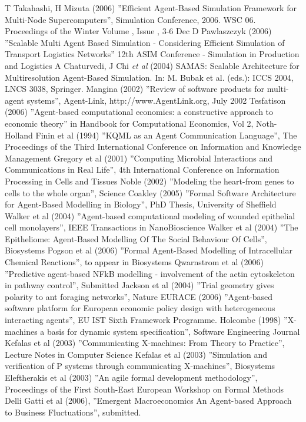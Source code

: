 
\begin{thebibliography}{99}
 T Takahashi, H Mizuta (2006) ''Efficient Agent-Based Simulation Framework for Multi-Node Supercomputers'', Simulation Conference, 2006. WSC 06. Proceedings of the Winter Volume , Issue , 3-6 Dec
 D Pawlaszczyk (2006) ''Scalable Multi Agent Based Simulation - Considering Efficient Simulation of Transport Logistics Networks'' 12th ASIM Conference - Simulation in Production and Logistics
  A Chaturvedi, J Chi \textsl{et al} (2004) SAMAS: Scalable Architecture for Multiresolution Agent-Based Simulation. In: M. Bubak et al. (eds.): ICCS 2004,
LNCS 3038, Springer.
 Mangina (2002) ''Review of software products for multi-agent systems'', Agent-Link, http://www.AgentLink.org, July 2002
 Tesfatison (2006) ''Agent-based computational economics: a constructive approach to economic theory'' in Handbook for Computational Economics, Vol 2, Noth-Holland
 Finin et al (1994) ''KQML as an Agent Communication Language'', The Proceedings of  the Third International Conference on Information and Knowledge Management
 Gregory et al (2001)  ''Computing Microbial Interactions and Communications in Real Life'', 4th International Conference on Information Processing in Cells and Tissues
 Noble (2002)  ''Modeling the heart-from genes to cells to the whole organ'', Science
 Coakley  (2005) ''Formal Software Architecture for Agent-Based Modelling in Biology'', PhD Thesis, University of Sheffield
 Walker et al (2004) ''Agent-based computational modeling of wounded epithelial cell monolayers'', IEEE Transactions in NanoBioscience
 Walker et al (2004) ''The Epitheliome: Agent-Based Modelling Of The Social Behaviour Of Cells'', Biosystems
 Pogson  et al (2006) ''Formal Agent-Based Modelling of Intracellular Chemical Reactions'', to appear in Biosystems
 Qwarnstrom et al (2006) ''Predictive agent-based NFkB modelling - involvement of the actin cytoskeleton in pathway control'', Submitted
 Jackson et al (2004) ''Trial geometry gives polarity to ant foraging networks'', Nature
 EURACE (2006)  ''Agent-based software platform for European economic policy design with heterogeneous interacting agents'', EU IST Sixth Framework Programme.
 Holcombe (1998) ''X-machines a basis for dynamic system specification'', Software Engineering Journal
 Kefalas et al (2003) ''Communicating X-machines: From Theory to Practice'', Lecture Notes in Computer Science
 Kefalas et al (2003) ''Simulation and verification of P systems through communicating X-machines'', Biosystems
 Eleftherakis et al (2003) ''An agile formal development methodology'', Proceedings of the First South-East European Workshop on Formal Methods
 Delli Gatti et al (2006), ''Emergent Macroeconomics An Agent-based Approach to Business Fluctuations'', submitted.
\end{thebibliography}